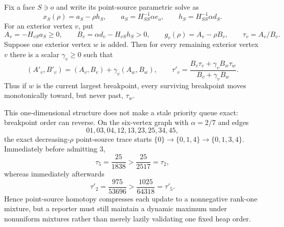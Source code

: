 \begin{proposition}
\label{prop:aesp-cd-point-source-homotopy-reorder}
Fix a face $S\ni o$ and write its point-source parametric solve as
\begin{equation*}
 x_S(\rho)=a_S-\rho h_S,\qquad
 a_S=H_{SS}^{-1}\alpha e_o,\qquad
 h_S=H_{SS}^{-1}\alpha d_S.
\end{equation*}
For an exterior vertex $v$, put
\begin{equation*}
 A_v=-H_{vS}a_S\geq0,\qquad
 B_v=\alpha d_v-H_{vS}h_S>0,\qquad
 g_v(\rho)=A_v-\rho B_v,\qquad
 \tau_v=A_v/B_v.
\end{equation*}
Suppose one exterior vertex $w$ is added.  Then for every remaining exterior
vertex $v$ there is a scalar $\gamma_v\geq0$ such that
\begin{equation}
 (A'_v,B'_v)=(A_v,B_v)+\gamma_v(A_w,B_w),\qquad
 \tau'_v=
 \frac{B_v\tau_v+\gamma_vB_w\tau_w}{B_v+\gamma_vB_w}.
 \label{eq:aesp-cd-point-source-homotopy-mix}
\end{equation}
Thus if $w$ is the current largest breakpoint, every surviving breakpoint
moves monotonically toward, but never past, $\tau_w$.

This one-dimensional structure does not make a stale priority queue exact:
breakpoint order can reverse.  On the six-vertex graph with
$\alpha=2/7$ and edges
\begin{equation*}
 01,03,04,12,13,23,25,34,45,
\end{equation*}
the exact decreasing-$\rho$ point-source trace starts
$\{0\}\to\{0,1,4\}\to\{0,1,3,4\}$.  Immediately before admitting $3$,
\begin{equation*}
 \tau_5=\frac{25}{1838}>\frac{25}{2517}=\tau_2,
\end{equation*}
whereas immediately afterwards
\begin{equation*}
 \tau'_2=\frac{975}{53696}>
 \frac{1025}{64318}=\tau'_5.
\end{equation*}
Hence point-source homotopy compresses each update to a nonnegative
rank-one mixture, but a reporter must still maintain a dynamic maximum under
nonuniform mixtures rather than merely lazily validating one fixed heap
order.
\end{proposition}

